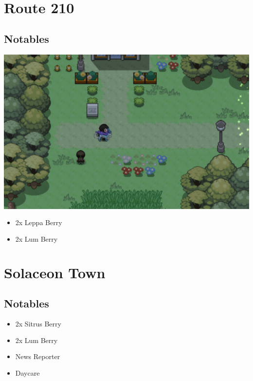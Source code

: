 \documentclass[11pt]{article}
\begin{document}





\section{Route 210}\label{sec:Route_210}

\subsection{Notables}\label{subsec:notables-route-210}

\includegraphics[width=\textwidth]{walkthrough/Sinnoh/Route_210}

\begin{itemize}
    \item 2x Leppa Berry
    \item 2x Lum Berry
\end{itemize}



\section{Solaceon Town}\label{sec:solaceon-town}

\subsection{Notables}\label{subsec:notables-solaceon-town}

\begin{itemize}
    \item 2x Sitrus Berry
    \item 2x Lum Berry
    \item News Reporter
    \item Daycare
\end{itemize}
\end{document}
